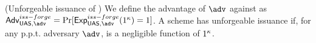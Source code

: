 
\begin{definition}{(Unforgeable issuance of \UAS)}
  \label{def:issue-forge-uas}  
  We define the advantage \AdvForgeIssue of $\adv$ against \ExpForgeIssue as
  $\AdvForgeIssue=\Pr\lbrack\ExpForgeIssue(1^\secpar)=1\rbrack$.
  A \UAS scheme has unforgeable issuance if, for any p.p.t. adversary $\adv$,
  \AdvForgeIssue is a negligible function of $1^\kappa$.
\end{definition}

